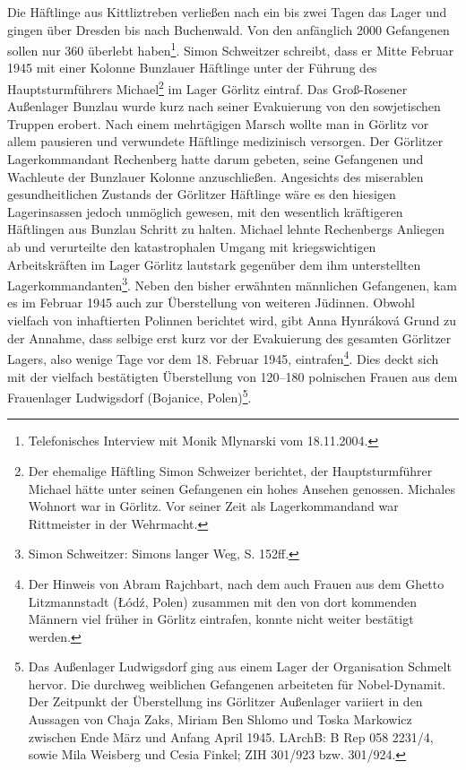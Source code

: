 Die Häftlinge aus Kittliztreben verließen nach ein bis zwei Tagen das Lager und gingen über Dresden bis nach Buchenwald. Von den anfänglich 2000 Gefangenen sollen nur 360 überlebt haben\footnote{Telefonisches Interview mit Monik Mlynarski vom 18.11.2004.}.
\newline
Simon Schweitzer schreibt, dass er Mitte Februar 1945 mit einer Kolonne Bunzlauer Häftlinge unter der Führung des Hauptsturmführers Michael\footnote{Der ehemalige Häftling Simon Schweizer berichtet, der Hauptsturmführer Michael hätte unter seinen Gefangenen ein hohes Ansehen genossen. Michales Wohnort war in Görlitz. Vor seiner Zeit als Lagerkommandand war Rittmeister in der Wehrmacht.} im Lager Görlitz eintraf. Das Groß-Rosener Außenlager Bunzlau wurde kurz nach seiner Evakuierung von den sowjetischen Truppen erobert. Nach einem mehrtägigen Marsch wollte man in Görlitz vor allem pausieren und verwundete Häftlinge medizinisch versorgen. Der Görlitzer Lagerkommandant Rechenberg hatte darum gebeten, seine Gefangenen und Wachleute der Bunzlauer Kolonne anzuschließen. Angesichts des miserablen gesundheitlichen Zustands der Görlitzer Häftlinge wäre es den hiesigen Lagerinsassen jedoch unmöglich gewesen, mit den wesentlich kräftigeren Häftlingen aus Bunzlau Schritt zu halten. Michael lehnte Rechenbergs Anliegen ab und verurteilte den katastrophalen Umgang mit kriegswichtigen Arbeitskräften im Lager Görlitz lautstark gegenüber dem ihm unterstellten Lagerkommandanten\footnote{Simon Schweitzer: Simons langer Weg, S. 152ff.}.
\newpage
Neben den bisher erwähnten männlichen Gefangenen, kam es im Februar 1945 auch zur Überstellung von weiteren Jüdinnen. Obwohl vielfach von inhaftierten Polinnen berichtet wird, gibt Anna Hynráková Grund zu der Annahme, dass selbige erst kurz vor der Evakuierung des gesamten Görlitzer Lagers, also wenige Tage vor dem 18. Februar 1945, eintrafen\footnote{Der Hinweis von Abram Rajchbart, nach dem auch Frauen aus dem Ghetto Litzmannstadt (\L \'od\'z, Polen) zusammen mit den von dort kommenden Männern viel früher in Görlitz eintrafen, konnte nicht weiter bestätigt werden.}. Dies deckt sich mit der vielfach bestätigten Überstellung von 120--180 polnischen Frauen aus dem Frauenlager Ludwigsdorf (Bojanice, Polen)\footnote{Das Außenlager Ludwigsdorf ging aus einem Lager der Organisation Schmelt hervor. Die durchweg weiblichen Gefangenen arbeiteten für Nobel-Dynamit. Der Zeitpunkt der Überstellung ins Görlitzer Außenlager variiert in den Aussagen von Chaja Zaks, Miriam Ben Shlomo und Toska Markowicz zwischen Ende März und Anfang April 1945. LArchB: B Rep 058 2231/4, sowie Mila Weisberg und Cesia Finkel; ZIH 301/923 bzw. 301/924.}. 
